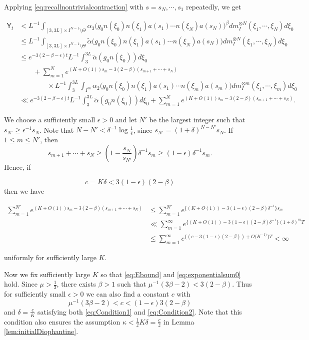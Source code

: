 \documentclass[12pt]{amsart}
\theoremstyle{definition}
\theoremstyle{remark}
\numberwithin{equation}{section}
\newcommand{\eps}{\epsilon}
\newcommand{\eqlabel}[2]
{
\begin{equation}
{#2}\label{#1}
\end{equation}
}
\begin{document}
    
    Applying \eqref{eq:recallnontrivialcontraction} with $s=s_N,\cdots,s_1$ repeatedly, we get
    \eqlabel{eq:Goodestimate1}{\begin{aligned}
        \mathsf{Y}_t&<L^{-1}\int_{[3,3L]\times I^{N-1}\setminus\Theta}\alpha_3\big(g_0n(\xi_0)n(\xi_1)a(s_1)\cdots n(\xi_N)a(s_N)\big)^{\beta}dm_I^{\otimes N}(\xi_1,\cdots,\xi_{N})d\xi_0\\&\leq L^{-1}\int_{[3,3L]\times I^{N-1}\setminus\Theta} \widetilde{\alpha}\big(g_0n(\xi_0)n(\xi_1)a(s_1)\cdots n(\xi_N)a(s_N)\big)dm_I^{\otimes N}(\xi_1,\cdots,\xi_{N})d\xi_0\\&\leq e^{-3(2-\beta - \epsilon) t}L^{-1}\int_{3}^{3L}\widetilde{\alpha}(g_0n(\xi_0))d\xi_0%
        \\&\qquad+\sum_{m=1}^{N}e^{(K+O(1))s_m-3(2-\beta)(s_{m+1}+\cdots+s_{N})}\\&\qquad\qquad\times L^{-1}\int_{3}^{3L}\int_{I^{m}}\alpha_{2}\big(g_0n(\xi_0)n(\xi_1)a(s_1)\cdots n(\xi_m)a(s_m)\big)dm_I^{\otimes m}(\xi_1,\cdots,\xi_{m})d\xi_0\\&\ll e^{-3(2-\beta-\epsilon) t}L^{-1}\int_{3}^{3L}\widetilde{\alpha}(g_0n(\xi_0))d\xi_0 +\sum_{m=1}^{N}e^{(K+O(1))s_m-3(2-\beta)(s_{m+1}+\cdots+s_{N})}.
    \end{aligned}}
    We choose a sufficiently small $\epsilon>0$ and let $N'$ be the largest integer such that $s_{N'}\geq \epsilon^{-1}s_N$. Note that $N-N'< \delta^{-1}\log\frac{1}{\eps}$, since $s_{N'}=(1+\delta)^{N-N'}s_N$. If $1\leq m\leq N'$, then $$s_{m+1}+\cdots+s_{N}\geq \left(1-\frac{s_N}{s_{N'}}\right)\delta^{-1}s_m\geq(1-\epsilon)\delta^{-1}s_m.$$
    Hence, if 
    \eqlabel{eq:Condition2}{c=K\delta<3(1-\epsilon)(2-\beta)} then we have
    \eqlabel{eq:exponentialsum0}{\begin{aligned}
        \sum_{m=1}^{N'}e^{(K+O(1))s_m-3(2-\beta)(s_{m+1}+\cdots+s_{N})}&\leq \sum_{m=1}^{N'}e^{\{(K+O(1))-3(1-\epsilon)(2-\beta)\delta^{-1}\}s_m}\\&\ll\sum_{m=1}^{\infty}e^{\{(K+O(1))-3(1-\epsilon)(2-\beta)\delta^{-1}\}(1+\delta)^mT}\\&\leq \sum_{m=1}^{\infty}e^{\{(c-3(1-\epsilon)(2-\beta))+O(K^{-1)}\}T}<\infty
    \end{aligned}}
    uniformly for sufficiently large $K$.  
     
    Now we fix sufficiently large $K$ so that \eqref{eq:Ebound} and \eqref{eq:exponentialsum0} hold. Since $\mu > \tfrac{1}{3}$, there exists $\beta>1$ such that $\mu^{-1}(3\beta-2)<3(2-\beta)$. Thus for sufficiently small $\epsilon>0$ we can also find a constant $c$ with $$\mu^{-1}(3\beta-2)<c<(1-\epsilon)3(2-\beta)$$ and $\delta=\frac{c}{K}$ satisfying both \eqref{eq:Condition1} and \eqref{eq:Condition2}. Note that this condition also ensures the assumption $\kappa<\frac{1}{2}K\delta=\tfrac{c}{2}$ in Lemma \ref{lem:initialDiophantine}.
    
\end{document}
